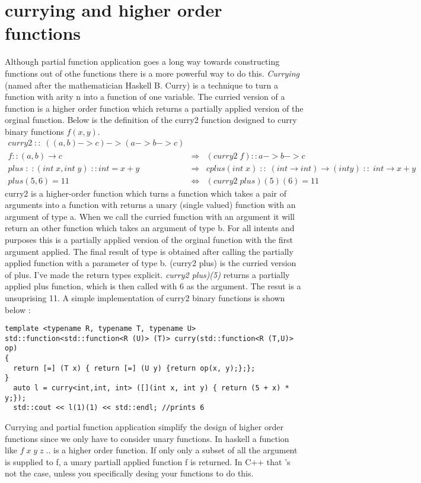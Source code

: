 \documentclass[12pt,fleqn]{article}
\begin{document}
\section*{currying and higher order functions}
Although partial function application  goes a long way towards constructing functions out of othe functions there is a more powerful way to do this.
{\em Currying} (named after the mathematician Haskell B. Curry) is a technique to turn a function with arity n into a function of one variable.
The curried version of a function is a higher order function which returns a partially applied version of the orginal function.
Below is the definition of the curry2 function designed to curry binary functions $f(x,y)$.
\begin{eqnarray*}
curry2 \; :: \; ((a,b) -> c)->(a->b->c) \\
f::(a,b) \rightarrow c &\Rightarrow&  (curry2\;f)::a->b->c \\
plus\;:\;:(int \;x, int \;y) \;::int = x+y &\Rightarrow& cplus(int\; x) \;::\; (int \rightarrow int) \rightarrow (int y) \;::\; int \rightarrow x+y  \\
plus(5,6) = 11 &\Leftrightarrow&(curry2 \; plus)(5)(6) = 11
\end{eqnarray*}
curry2 is a higher-order function which turns a function which takes a pair of arguments into a function with returns a unary (single valued) function with an argument of type a.
When we call the curried function with an argument it will return an other function which takes an argument of type b.
For all intents and purposes this is a partially applied version of the orginal function with the first argument applied.
The final result of type is obtained after calling the partially applied function with a parameter of type b.
(curry2 plus) is the curried version of plus. 
I've made the return types explicit.
{\em curry2 plus)(5)} returns a partially applied plus function, which is then called with 6 as the argument. The resut is a unsuprising 11.
A simple implementation of curry2 binary functions is shown below :
\begin{lstlisting}
template <typename R, typename T, typename U>
std::function<std::function<R (U)> (T)> curry(std::function<R (T,U)> op)
{
  return [=] (T x) { return [=] (U y) {return op(x, y);};};
}
  auto l = curry<int,int, int> ([](int x, int y) { return (5 + x) * y;});
  std::cout << l(1)(1) << std::endl; //prints 6
\end{lstlisting}
Currying and partial function application simplify the design of higher order functions since we only have to consider unary functions.
In haskell a function like $f\;x\;y\;z\;..$ is a higher order function. 
If only only a subset of all the argument is supplied to f, a unary partiall applied function f is returned.
In C++ that 's not the case, unless you specifically desing your functions to do this.
\end{document}
